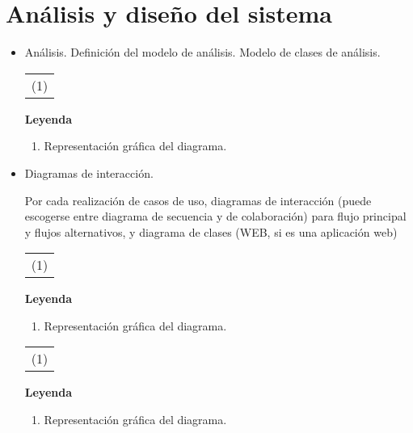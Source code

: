 \chapter{\large Análisis y diseño del sistema}\label{Capítulo 3}

\pagestyle{fancy}
\lhead{}
\chead{}
\lfoot{}
\cfoot{}
\rfoot{\thepage}
\renewcommand{\headrulewidth}{0.4pt}
\vspace{-1cm}

\begin{itemize}
 \item \lettrine[lines=2, lraise=0, nindent=0em, slope=-.5em]{A}{}nálisis.
    \subitem Definición del modelo de análisis. Modelo de clases de análisis.
\begin{longtable}[c]{|l|}
\hline
\rowcolor{gray}
\multicolumn{1}{|>{\columncolor{Light}}c|}{DIAGRAMA DE CLASES DE ANÁLISIS}\\
\hline
\multicolumn{1}{|c|}{(1)}\\
\hline
\end{longtable}
    {\bf Leyenda}
    \begin{enumerate}
     \item Representación gráfica del diagrama.
    \end{enumerate}

\item Diagramas de interacción.

Por cada realización de casos de uso, diagramas de interacción (puede escogerse entre diagrama de secuencia 
y de colaboración) para flujo principal y flujos alternativos, y diagrama de clases (WEB, si es una 
aplicación web)

\begin{longtable}[c]{|l|}
\hline
\rowcolor{gray}
\multicolumn{1}{|>{\columncolor{Light}}c|}{DIAGRAMA DE INTERACCIÓN}\\
\hline
\multicolumn{1}{|c|}{(1)}\\
\hline
\end{longtable}
    {\bf Leyenda}
    \begin{enumerate}
     \item Representación gráfica del diagrama.
    \end{enumerate}


\begin{longtable}[c]{|l|}
\hline
\rowcolor{gray}
\multicolumn{1}{|>{\columncolor{Light}}c|}{DIAGRAMA DE CLASES}\\
\hline
\multicolumn{1}{|c|}{(1)}\\
\hline
\end{longtable}
{\bf Leyenda}
    \begin{enumerate}
     \item Representación gráfica del diagrama.
    \end{enumerate}



\end{itemize}
